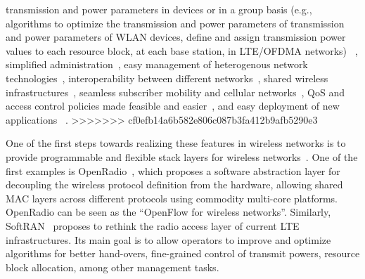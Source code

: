 transmission and power parameters in devices or in a group basis (e.g., algorithms to optimize the transmission and power parameters of
transmission and power parameters of WLAN devices, define and assign transmission power values to each resource block, at each base station, in LTE/OFDMA networks) ~\cite{ali-ahmad2013,gudipati2013}, simplified administration~\cite{schulz-zander2014-atc,yap2010-1,gudipati2013}, easy management of heterogenous network technologies~\cite{yap2010-1,gudipati2013,yap2010-2}, interoperability between different networks~\cite{yap2010-2,jin2013}, shared wireless infrastructures~\cite{yap2010-2}, seamless subscriber mobility and cellular networks~\cite{li2012}, QoS and access control policies made feasible and easier~\cite{li2012,jin2013}, and easy deployment of new applications 
~\cite{schulz-zander2014-atc,gudipati2013,yap2010-2}. 
>>>>>>> cf0efb14a6b582e806c087b3fa412b9afb5290e3


One of the first steps towards realizing these features in wireless networks is to provide programmable and 
flexible stack layers for wireless networks~\cite{bansal2012,gudipati2013}.
One of the first examples is OpenRadio~\cite{bansal2012}, which proposes a software 
abstraction layer for decoupling the wireless protocol definition from the hardware, allowing shared MAC 
layers across different protocols using commodity multi-core platforms. OpenRadio can be seen as the 
``OpenFlow for wireless networks''. Similarly, SoftRAN~\cite{gudipati2013} proposes to rethink 
the radio access layer of current LTE infrastructures. Its main goal is to allow operators to improve and 
optimize algorithms for better hand-overs, fine-grained control of transmit powers, resource block allocation, 
among other management tasks.

